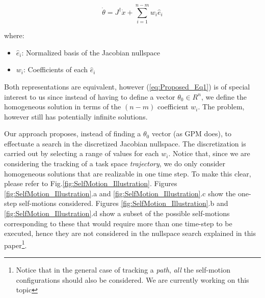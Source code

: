 \documentclass[conference]{IEEEtran}
\newcommand{\Jps}{ \ensuremath{J^{\dagger}} }
\newcommand{\dx}{ \ensuremath{\dot{x}} }
\newcommand{\dq}{ \ensuremath{\dot{\theta}} }
\newcommand{\q}{ \ensuremath{\theta } }
\newcommand{\nsb}{ \ensuremath{ \hat{e} } }
\newcommand{\nsc}{ \ensuremath{ w } }
\begin{document}
\begin{equation}
\dq = \Jps \dx + \displaystyle \sum_{i=1}^{n-m} \nsc_{i}\nsb_{i}
\label{eq:Proposed_Eq1}
\end{equation}

where:
\begin{itemize}
\item{ $\nsb_{i}$: Normalized basis of the Jacobian nullspace}
\item{$\nsc_{i}$: Coefficients of each $\nsb_{i}$}
\end{itemize}

Both representations are equivalent, however (\ref{eq:Proposed_Eq1}) is of special interest to us since
instead of having to define a vector $\q_{0} \in R^{n}$, we define the homogeneous solution in terms of 
the $(n-m)$ coefficient $\nsc_{i}$. The problem, however still has potentially infinite solutions.

Our approach proposes, instead of finding a $\q_{0}$ vector (as GPM does), to effectuate a 
search in the discretized Jacobian nullspace. The discretization is carried out by selecting a range of
values for each $\nsc_{i}$. Notice that, since we are considering the tracking of a task space \textit{trajectory}, 
we do only consider homogeneous solutions that are realizable in one time step. To make this clear, please refer 
to Fig.\ref{fig:SelfMotion_Illustration}. Figures \ref{fig:SelfMotion_Illustration}.a and 
\ref{fig:SelfMotion_Illustration}.c show the one-step self-motions considered. Figures \ref{fig:SelfMotion_Illustration}.b 
and \ref{fig:SelfMotion_Illustration}.d show a subset of the possible self-motions corresponding to these 
that would require more than one time-step to be executed, hence they are not considered in 
the nullspace search explained in this paper\footnote{Notice that in the
general case of tracking a \textit{path}, \textit{all} the self-motion configurations should also be considered. We
are currently working on this topic}.     
\end{document}
